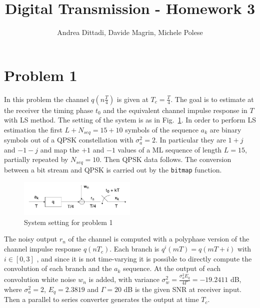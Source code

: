 \documentclass[10pt]{article}
\begin{document}
\title{Digital Transmission - Homework 3}
\author{Andrea Dittadi, Davide Magrin, Michele Polese}

\maketitle


\section*{Problem 1}

In this problem the channel $q(n\frac{T}{4})$ is given at $T_c = \frac{T}{4}$. The goal is to estimate at the receiver the timing phase $t_0$ and the equivalent channel impulse response in $T$ with LS method.
The setting of the system is as in Fig.~\ref{fig:channel_T4}. In order to perform LS estimation the first $L + N_{seq} = 15 + 10$ symbols of the sequence $a_k$ are binary symbols out of a QPSK constellation with $\sigma_a^2 = 2$. 
In particular they are $1+j$ and $-1-j$ and map the $+1$ and $-1$ values of a ML sequence of length $L = 15$, partially repeated by $N_{seq}=10$. Then QPSK data follows. 
The conversion between a bit stream and QPSK is carried out by the \texttt{bitmap} function. %

\begin{figure}
	\centering
	\includegraphics[width = 0.5\textwidth]{channel_T4}
	\caption{System setting for problem 1}
	\label{fig:channel_T4}
\end{figure}


The noisy output $r_n$ of the channel is computed with a polyphase version of the channel impulse response $q(nT_c)$. Each branch is $q^{i}(mT) = q(mT + i)$ with $i \in [0, 3]$ , and since it is not time-varying it is possible to directly compute the convolution of each branch and the $a_k$ sequence. At the output of each convolution white noise $w_n$ is added, with variance $\sigma_w^2 = \frac{\sigma_a^2 E_q}{4 \Gamma} = -19.2411$ dB, where $\sigma_a^2 = 2$, $E_q = 2.3819$ and $\Gamma = 20$ dB is the given SNR at receiver input. Then a parallel to series converter generates the output at time $T_c$.
\end{document}
